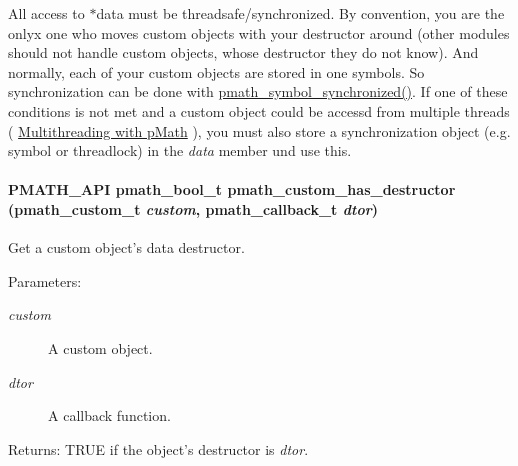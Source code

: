 All access to $\ast$data must be threadsafe/synchronized. By convention, you are the onlyx one who moves custom objects with your destructor around (other modules should not handle custom objects, whose destructor they do not know). And normally, each of your custom objects are stored in one symbols. So synchronization can be done with \hyperlink{group__symbols_g95b141d9cb33fba80d6a807f304ee3b7}{pmath\_\-symbol\_\-synchronized()}. If one of these conditions is not met and a custom object could be accessd from multiple threads ( \hyperlink{group__threads}{Multithreading with pMath} ), you must also store a synchronization object (e.g. symbol or threadlock) in the {\em data\/} member und use this. \hypertarget{group__custom_g0847bc90fa81ddfdf0f3ff84d32947cf}{
\paragraph[{pmath\_\-custom\_\-has\_\-destructor}]{\setlength{\rightskip}{0pt plus 5cm}PMATH\_\-API {\bf pmath\_\-bool\_\-t} pmath\_\-custom\_\-has\_\-destructor ({\bf pmath\_\-custom\_\-t} {\em custom}, \/  {\bf pmath\_\-callback\_\-t} {\em dtor})}\hfill}
\label{group__custom_g0847bc90fa81ddfdf0f3ff84d32947cf}


Get a custom object's data destructor. 

\begin{Desc}
\item[Parameters:]
\begin{description}
\item[{\em custom}]A custom object. \item[{\em dtor}]A callback function. \end{description}
\end{Desc}
\begin{Desc}
\item[Returns:]TRUE if the object's destructor is {\em dtor\/}. \end{Desc}
